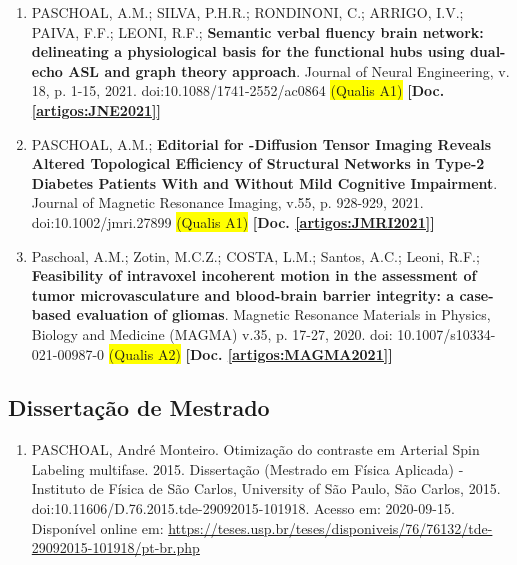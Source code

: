 \documentclass[a4paper,oneside,10pt]{article}
\begin{document}
\begin{enumerate}
        \item PASCHOAL, A.M.; SILVA, P.H.R.; RONDINONI, C.; ARRIGO, I.V.; PAIVA, F.F.; LEONI, R.F.; \textbf{Semantic verbal fluency brain network: delineating a physiological basis for the functional hubs using dual-echo ASL and graph theory approach}. Journal of Neural Engineering, v. 18, p. 1-15, 2021. doi:10.1088/1741-2552/ac0864 \colorbox{yellow}{(Qualis A1)} \textbf{[Doc. \ref{artigos:JNE2021}]}
        
        \item PASCHOAL, A.M.; \textbf{Editorial for -Diffusion Tensor Imaging Reveals Altered Topological Efficiency of Structural Networks in Type-2 Diabetes Patients With and Without Mild Cognitive Impairment}. Journal of Magnetic Resonance Imaging, v.55, p. 928-929, 2021. doi:10.1002/jmri.27899 \colorbox{yellow}{(Qualis A1)} \textbf{[Doc. \ref{artigos:JMRI2021}]} 
        
        \item Paschoal, A.M.; Zotin, M.C.Z.; COSTA, L.M.; Santos, A.C.; Leoni, R.F.; \textbf{Feasibility of intravoxel incoherent motion in the assessment of tumor microvasculature and blood-brain barrier integrity: a case-based evaluation of gliomas}. Magnetic Resonance Materials in Physics, Biology and Medicine (MAGMA) v.35, p. 17-27, 2020. doi: 10.1007/s10334-021-00987-0 \colorbox{yellow}{(Qualis A2)} \textbf{[Doc. \ref{artigos:MAGMA2021}]}

\end{enumerate}

\subsection{Dissertação de Mestrado}
\vspace{0.3cm}

\begin{enumerate}
\renewcommand{\labelenumi}{{\large\bfseries\arabic{enumi}.}}

        \item PASCHOAL, André Monteiro. Otimização do contraste em Arterial Spin Labeling multifase. 2015. Dissertação (Mestrado em Física Aplicada) - Instituto de Física de São Carlos, University of São Paulo, São Carlos, 2015. doi:10.11606/D.76.2015.tde-29092015-101918. Acesso em: 2020-09-15. Disponível online em: \url{https://teses.usp.br/teses/disponiveis/76/76132/tde-29092015-101918/pt-br.php}

\end{enumerate}
\end{document}
